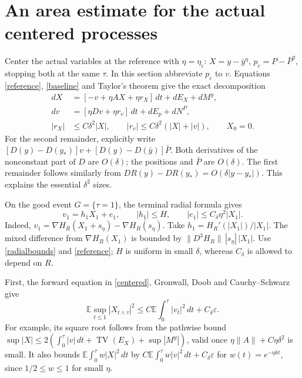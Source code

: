 \documentclass[11pt,a4paper]{article}
\newcommand{\E}{\mathbb E}
\newcommand{\TV}{\operatorname{TV}}
\newcommand{\dt}{\,dt}
\begin{document}
\section{An area estimate for the actual centered processes}
Center the actual variables at the reference with $\eta=\eta_\varepsilon$:
$X=y-\bar y^\eta$, $p_c=P-\bar P^\eta$, stopping both at the same
$\tau$. In this section abbreviate $p_c$ to $v$.
Equations \eqref{reference}, \eqref{baseline} and Taylor's theorem
give the exact decomposition
\begin{equation}\label{centered}
 \begin{split}
 dX&=[-v+\eta AX+\eta r_X]\dt+dE_X+dM^y,\\
 dv&=[\eta Dv+\eta r_v]\dt+dE_p+dN^P,\\
 |r_X|&\leq C\delta^2|X|,\qquad
 |r_v|\leq C\delta^2(|X|+|v|),\qquad X_0=0.
 \end{split}
\end{equation}
For the second remainder, explicitly write
$[D(y)-D(y_*)]v+[D(y)-D(\bar y)]\bar P$.
Both derivatives of the nonconstant part of $D$ are $O(\delta)$;
the positions and $\bar P$ are $O(\delta)$.
The first remainder follows similarly from
$DR(y)-DR(y_*)=O(\delta|y-y_*|)$.
This explains the essential $\delta^2$ sizes.

On the good event $G=\{\tau=1\}$, the terminal radial formula gives
\begin{equation}\label{terminal}
 v_1=h_1X_1+e_1,\qquad |h_1|\leq H,\qquad
 |e_1|\leq C_\delta\eta^2|X_1|.
\end{equation}
Indeed, $v_1=\nabla H_R(X_1+s_\eta)-\nabla H_R(s_\eta)$.
Take $h_1=H_R'(|X_1|)/|X_1|$. The mixed difference from
$\nabla H_R(X_1)$ is bounded by
$\|D^3H_R\|\,|s_\eta|\,|X_1|$.
Use \eqref{radialbounds} and \eqref{reference}; $H$ is uniform in
small $\delta$, whereas $C_\delta$ is allowed to depend on $R$.

First, the forward equation in \eqref{centered}, Gronwall, Doob and
Cauchy--Schwarz give
\begin{equation}\label{Poincare}
 \E\sup_{t\leq1}|X_{t\wedge\tau}|^2
       \leq C\E\int_0^\tau|v_t|^2\dt+C_\delta\varepsilon.
\end{equation}
For example, its square root follows from the pathwise bound
$\sup|X|\leq2(\int_0^\tau|v|\dt+\TV(E_X)+\sup|M^y|)$,
valid once $\eta\|A\|+C\eta\delta^2$ is small.
It also bounds $\E\int_0^\tau w|X|^2\dt$ by
$C\E\int_0^\tau w|v|^2\dt+C_\delta\varepsilon$ for
$w(t)=e^{-\eta kt}$, since $1/2\leq w\leq1$ for small $\eta$.
\end{document}
